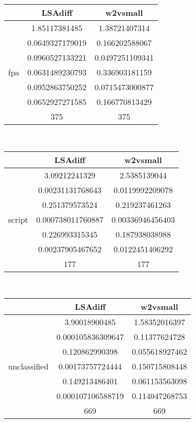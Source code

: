 \documentclass{article}
\begin{document}
\begin{tabular}{ccc|}\cline{2-3}
&\multicolumn{1}{|c}{LSAdiff} & w2vsmall \\\hline
\multicolumn{1}{|c|}{\multirow{7}{*}{fpa}} & 1.85117381485 & 1.38721407314 \\
\multicolumn{1}{|c|}{} & 0.0649327179019 & 0.166202588067 \\
\multicolumn{1}{|c|}{} & 0.0960527133221 & 0.0497251109341 \\
\multicolumn{1}{|c|}{} & 0.0631489230793 & 0.336903181159 \\
\multicolumn{1}{|c|}{} & 0.0952863750252 & 0.0715473000877 \\
\multicolumn{1}{|c|}{} & 0.0652927271585 & 0.166770813429 \\
\multicolumn{1}{|c|}{} & 375 & 375 \\
\hline
\end{tabular}\\
\begin{tabular}{ccc|}\cline{2-3}
&\multicolumn{1}{|c}{LSAdiff} & w2vsmall \\\hline
\multicolumn{1}{|c|}{\multirow{7}{*}{script}} & 3.09212241329 & 2.5385139044 \\
\multicolumn{1}{|c|}{} & 0.00231131768643 & 0.0119992209078 \\
\multicolumn{1}{|c|}{} & 0.251379573524 & 0.219237461263 \\
\multicolumn{1}{|c|}{} & 0.000738011760887 & 0.00336946456403 \\
\multicolumn{1}{|c|}{} & 0.226993315345 & 0.187938038988 \\
\multicolumn{1}{|c|}{} & 0.00237905467652 & 0.0122451406292 \\
\multicolumn{1}{|c|}{} & 177 & 177 \\
\hline
\end{tabular}\\
\begin{tabular}{ccc|}\cline{2-3}
&\multicolumn{1}{|c}{LSAdiff} & w2vsmall \\\hline
\multicolumn{1}{|c|}{\multirow{7}{*}{unclassified}} & 3.90018900485 & 1.58352016397 \\
\multicolumn{1}{|c|}{} & 0.000105836309647 & 0.11377624728 \\
\multicolumn{1}{|c|}{} & 0.120862990398 & 0.055618927462 \\
\multicolumn{1}{|c|}{} & 0.00173757724444 & 0.150715808448 \\
\multicolumn{1}{|c|}{} & 0.149213486401 & 0.061153563098 \\
\multicolumn{1}{|c|}{} & 0.000107106588719 & 0.114047268753 \\
\multicolumn{1}{|c|}{} & 669 & 669 \\
\hline
\end{tabular}\\
\end{document}
